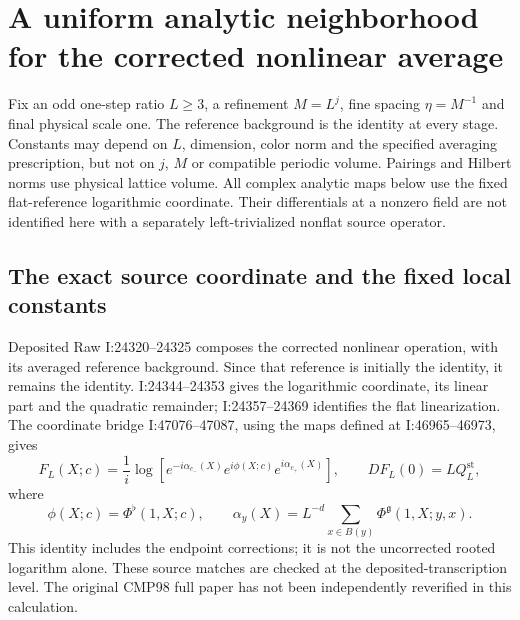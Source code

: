 \documentclass[11pt]{article}
\theoremstyle{remark}\newtheorem{remark}[theorem]{Remark}
\newcommand{\norm}[1]{\left\lVert#1\right\rVert}
\begin{document}

\section{A uniform analytic neighborhood for the corrected nonlinear average}
\label{na-section}

Fix an odd one-step ratio $L\ge3$, a refinement $M=L^j$, fine
spacing $\eta=M^{-1}$ and final physical scale one. The reference
background is the identity at every stage. Constants may depend on
$L$, dimension, color norm and the specified averaging prescription,
but not on $j$, $M$ or compatible periodic volume. Pairings and
Hilbert norms use physical lattice volume. All complex analytic maps
below use the fixed flat-reference logarithmic coordinate. Their
differentials at a nonzero field are not identified here with a
separately left-trivialized nonflat source operator.

\subsection{The exact source coordinate and the fixed local constants}
\label{na-source}

Deposited Raw I:24320--24325 composes the corrected nonlinear
operation, with its averaged reference background. Since that
reference is initially the identity, it remains the identity.
I:24344--24353 gives the logarithmic coordinate, its linear part and
the quadratic remainder; I:24357--24369 identifies the flat
linearization. The coordinate bridge I:47076--47087, using the maps
defined at I:46965--46973, gives
\begin{equation}
 F_L(X;c)=\frac1i\log\left[
  e^{-i\alpha_{c_-}(X)}e^{i\phi(X;c)}e^{i\alpha_{c_+}(X)}\right],
 \qquad DF_L(0)=LQ_L^{\mathrm{st}},
 \label{na-coordinate}
\end{equation}
where
\[
 \phi(X;c)=\Phi^{\flat}(1,X;c),\qquad
 \alpha_y(X)=L^{-d}\sum_{x\in B(y)}\Phi^{\mathfrak g}(1,X;y,x).
\]
This identity includes the endpoint corrections; it is not the
uncorrected rooted logarithm alone. These source matches are checked
at the deposited-transcription level. The original CMP98 full paper
has not been independently reverified in this calculation.
\end{document}
